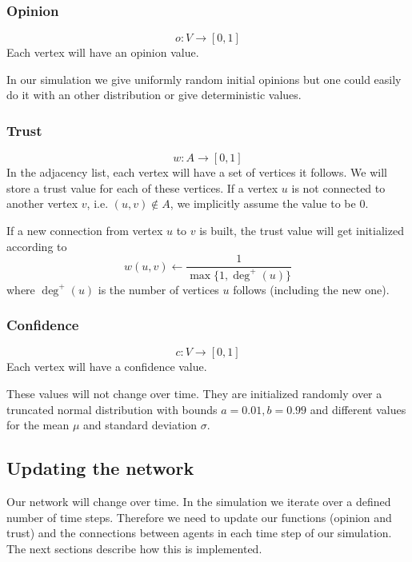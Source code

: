 \documentclass[11pt]{article}
\begin{document}
\subsubsection{Opinion}
\[o:V\rightarrow[0,1]\]
Each vertex will have an opinion value.\par
In our simulation we give uniformly random initial opinions but one could easily do it with an other distribution or give deterministic values.
\subsubsection{Trust}
\[w:A\rightarrow[0,1]\]
In the adjacency list, each vertex will have a set of vertices it follows. We will store a trust value for each of these vertices. If a vertex \(u\) is not connected to another vertex \(v\), i.e. \((u,v)\notin A\), we implicitly assume the value to be 0.\par
If a new connection from vertex \(u\) to \(v\) is built, the trust value will get initialized according to
\[w(u,v)\leftarrow \frac{1}{\max \{1, \deg^+(u)\}}\]
where \(\deg^+(u)\) is the number of vertices \(u\) follows (including the new one).

\subsubsection{Confidence}
\[c:V\rightarrow[0,1]\]
Each vertex will have a confidence value.\par
These values will not change over time. They are initialized randomly over a truncated normal distribution with bounds \(a=0.01,b=0.99\) and different values for the mean \(\mu\) and standard deviation \(\sigma\).

\subsection{Updating the network}
Our network will change over time. In the simulation we iterate over a defined number of time steps. Therefore we need to update our functions (opinion and trust) and the connections between agents in each time step of our simulation. The next sections describe how this is implemented.
\end{document}
